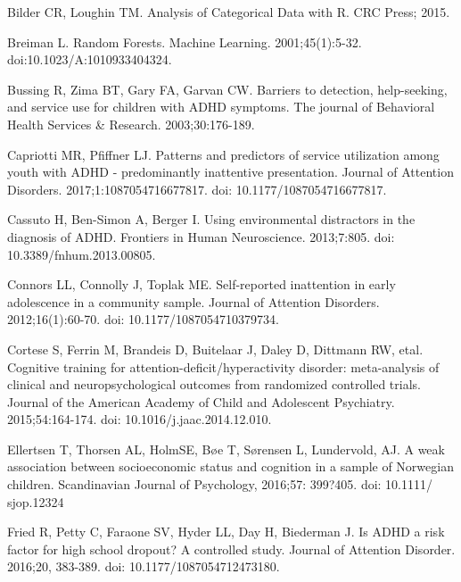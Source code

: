 \documentclass[10pt,letterpaper]{article}
\begin{document}
{{\begin{thebibliography}{10}

Bilder CR,  Loughin TM.
\newblock Analysis of Categorical Data with R.
\newblock CRC Press; 2015.

Breiman L.
\newblock Random Forests. 
\newblock Machine Learning. 2001;45(1):5-32. doi:10.1023/A:1010933404324.

Bussing R, Zima BT, Gary FA, Garvan CW.
\newblock Barriers to detection, help-seeking, and service use for children
  with {ADHD} symptoms.
\newblock The journal of Behavioral Health Services \& Research. 2003;30:176-189.

Capriotti MR, Pfiffner LJ.
\newblock Patterns and predictors of service utilization among youth with
  {ADHD} - predominantly inattentive presentation.
\newblock Journal of Attention Disorders. 2017;1:1087054716677817. doi: 10.1177/1087054716677817.

Cassuto H, Ben-Simon A, Berger I.
\newblock Using environmental distractors in the diagnosis of {ADHD}.
\newblock Frontiers in Human Neuroscience. 2013;7:805. doi: 10.3389/fnhum.2013.00805.

Connors LL, Connolly J, Toplak ME.
\newblock Self-reported inattention in early adolescence in a community sample.
\newblock Journal of Attention Disorders.  2012;16(1):60-70. doi: 10.1177/1087054710379734.

Cortese S, Ferrin M, Brandeis D, Buitelaar J, Daley D,
  Dittmann RW, etal.
\newblock Cognitive training for attention-deficit/hyperactivity disorder:
  meta-analysis of clinical and neuropsychological outcomes from randomized
  controlled trials.
\newblock Journal of the American Academy of Child and Adolescent
  Psychiatry. 2015;54:164-174. doi: 10.1016/j.jaac.2014.12.010.
  
Ellertsen T, Thorsen AL, HolmSE, B\o{}e T, S\o{}rensen L, Lundervold,
AJ.
\newblock A weak association between socioeconomic status and cognition
in a sample of Norwegian children. 
\newblock Scandinavian Journal of Psychology, 2016;57: 399?405. doi: 10.1111/
sjop.12324
  
 Fried R, Petty C, Faraone SV, Hyder LL, Day H, Biederman J.
\newblock Is ADHD a risk factor for high school dropout? A controlled
study. 
 \newblock Journal of Attention Disorder. 2016;20, 383-389. doi: 10.1177/1087054712473180.
 

\end{thebibliography}}}
\end{document}
